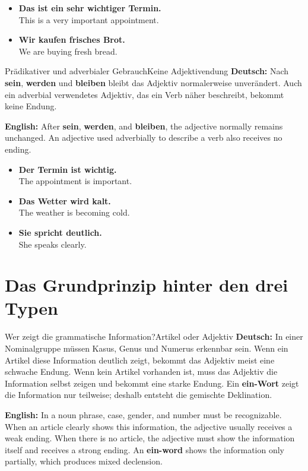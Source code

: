 \documentclass[a4paper,11pt]{article}
\newcommand{\GermanText}[1]{\textbf{Deutsch: }#1\par}
\newcommand{\EnglishText}[1]{{\small\color{SoftGray}\textbf{English: }#1\par}}
\newcommand{\ExampleItem}[2]{\item \textbf{#1}\\{\small\color{SoftGray}#2}}
\begin{document}
        \begin{exbox}
            \begin{itemize}
                \ExampleItem{Das ist ein sehr wichtiger Termin.}{This is a very important appointment.}
                \ExampleItem{Wir kaufen frisches Brot.}{We are buying fresh bread.}
            \end{itemize}
        \end{exbox}

        \begin{grammarentry}{Prädikativer und adverbialer Gebrauch}{Keine Adjektivendung}
            \GermanText{Nach \textbf{sein}, \textbf{werden} und \textbf{bleiben} bleibt das Adjektiv normalerweise unverändert. Auch ein adverbial verwendetes Adjektiv, das ein Verb näher beschreibt, bekommt keine Endung.}
            \EnglishText{After \textbf{sein}, \textbf{werden}, and \textbf{bleiben}, the adjective normally remains unchanged. An adjective used adverbially to describe a verb also receives no ending.}
        \end{grammarentry}

        \begin{exbox}
            \begin{itemize}
                \ExampleItem{Der Termin ist wichtig.}{The appointment is important.}
                \ExampleItem{Das Wetter wird kalt.}{The weather is becoming cold.}
                \ExampleItem{Sie spricht deutlich.}{She speaks clearly.}
            \end{itemize}
        \end{exbox}

    \section{Das Grundprinzip hinter den drei Typen}

        \begin{grammarentry}{Wer zeigt die grammatische Information?}{Artikel oder Adjektiv}
            \GermanText{In einer Nominalgruppe müssen Kasus, Genus und Numerus erkennbar sein. Wenn ein Artikel diese Information deutlich zeigt, bekommt das Adjektiv meist eine schwache Endung. Wenn kein Artikel vorhanden ist, muss das Adjektiv die Information selbst zeigen und bekommt eine starke Endung. Ein \textbf{ein-Wort} zeigt die Information nur teilweise; deshalb entsteht die gemischte Deklination.}
            \EnglishText{In a noun phrase, case, gender, and number must be recognizable. When an article clearly shows this information, the adjective usually receives a weak ending. When there is no article, the adjective must show the information itself and receives a strong ending. An \textbf{ein-word} shows the information only partially, which produces mixed declension.}
        \end{grammarentry}
\end{document}
